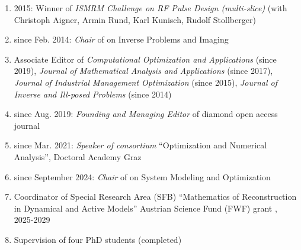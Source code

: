 \begin{enumerate}
    \item 2015: Winner of \emph{ISMRM Challenge on RF Pulse Design (multi-slice)} (with Christoph Aigner, Armin Rund, Karl Kunisch, Rudolf Stollberger)
    \item since Feb. 2014: \emph{Chair} of  on Inverse Problems and Imaging
    \item Associate Editor of \emph{Computational Optimization and Applications} (since 2019), \emph{Journal of Mathematical Analysis and Applications} (since 2017), \emph{Journal of Industrial Management Optimization} (since 2015), \emph{Journal of Inverse and Ill-posed Problems} (since 2014)
    \item since Aug. 2019: \emph{Founding and Managing Editor} of diamond open access journal 
    \item since Mar. 2021: \emph{Speaker of consortium} \enquote{Optimization and Numerical Analysis}, Doctoral Academy Graz
    \item since September 2024: \emph{Chair} of  on System Modeling and Optimization
    \item Coordinator of Special Research Area (SFB) ``Mathematics of Reconstruction in Dynamical and Active Models'' Austrian Science Fund (FWF) grant , 2025-2029
    \item Supervision of four PhD students (completed)
\end{enumerate}

